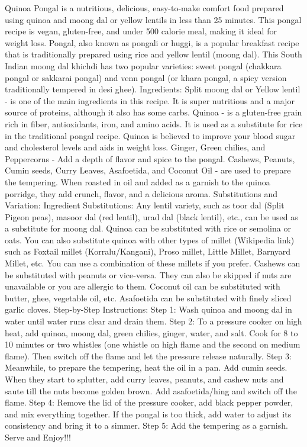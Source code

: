 Quinoa Pongal is a nutritious, delicious, easy-to-make comfort food prepared using quinoa and moong dal or yellow lentils in less than 25 minutes. This pongal recipe is vegan, gluten-free, and under 500 calorie meal, making it ideal for weight loss. Pongal, also known as pongali or huggi, is a popular breakfast recipe that is traditionally prepared using rice and yellow lentil (moong dal). This South Indian moong dal khichdi has two popular varieties: sweet pongal (chakkara pongal or sakkarai pongal) and venn pongal (or khara pongal, a spicy version traditionally tempered in desi ghee). Ingredients: Split moong dal or Yellow lentil - is one of the main ingredients in this recipe. It is super nutritious and a major source of proteins, although it also has some carbs. Quinoa - is a gluten-free grain rich in fiber, antioxidants, iron, and amino acids. It is used as a substitute for rice in the traditional pongal recipe. Quinoa is believed to improve your blood sugar and cholesterol levels and aids in weight loss. Ginger, Green chilies, and Peppercorns - Add a depth of flavor and spice to the pongal. Cashews, Peanuts, Cumin seeds, Curry Leaves, Asafoetida, and Coconut Oil - are used to prepare the tempering. When roasted in oil and added as a garnish to the quinoa porridge, they add crunch, flavor, and a delicious aroma. Substitutions and Variation: Ingredient Substitutions: Any lentil variety, such as toor dal (Split Pigeon peas), masoor dal (red lentil), urad dal (black lentil), etc., can be used as a substitute for moong dal. Quinoa can be substituted with rice or semolina or oats. You can also substitute quinoa with other types of millet (Wikipedia link) such as Foxtail millet (Korralu/Kangani), Proso millet, Little Millet, Barnyard Millet, etc. You can use a combination of these millets if you prefer. Cashews can be substituted with peanuts or vice-versa. They can also be skipped if nuts are unavailable or you are allergic to them. Coconut oil can be substituted with butter, ghee, vegetable oil, etc. Asafoetida can be substituted with finely sliced garlic cloves. Step-by-Step Instructions: Step 1: Wash quinoa and moong dal in water until water runs clear and drain them. Step 2: To a pressure cooker on high heat, add quinoa, moong dal, green chilies, ginger, water, and salt. Cook for 8 to 10 minutes or two whistles (one whistle on high flame and the second on medium flame). Then switch off the flame and let the pressure release naturally. Step 3: Meanwhile, to prepare the tempering, heat the oil in a pan. Add cumin seeds. When they start to splutter, add curry leaves, peanuts, and cashew nuts and saute till the nuts become golden brown. Add asafoetida/hing and switch off the flame. Step 4: Remove the lid of the pressure cooker, add black pepper powder, and mix everything together. If the pongal is too thick, add water to adjust its consistency and bring it to a simmer. Step 5: Add the tempering as a garnish. Serve and Enjoy!!!
\par

